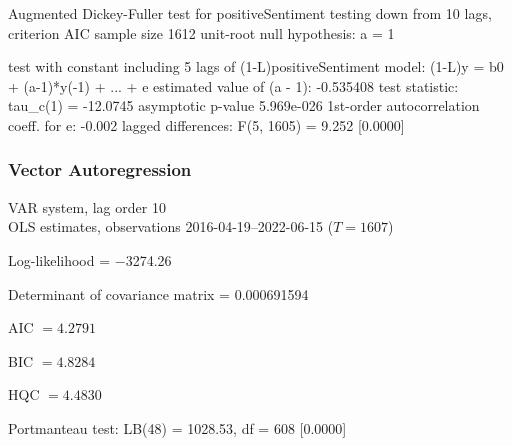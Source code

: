 Augmented Dickey-Fuller test for positiveSentiment
testing down from 10 lags, criterion AIC
sample size 1612
unit-root null hypothesis: a = 1

test with constant 
including 5 lags of (1-L)positiveSentiment
model: (1-L)y = b0 + (a-1)*y(-1) + ... + e
estimated value of (a - 1): -0.535408
test statistic: tau\_c(1) = -12.0745
asymptotic p-value 5.969e-026
1st-order autocorrelation coeff. for e: -0.002
lagged differences: F(5, 1605) = 9.252 [0.0000]

\subsubsection{Vector Autoregression}

\begin{center}
VAR system, lag order 10\\
OLS estimates, observations 2016-04-19--2022-06-15 ($T=1607$)
\end{center}
\noindent
Log-likelihood = $-$3274.26\par
\noindent
Determinant of covariance matrix = 0.000691594\par
\noindent
AIC $= 4.2791$ \par
\noindent
BIC $= 4.8284$ \par
\noindent
HQC $= 4.4830$ \par
\noindent
Portmanteau test: LB(48) = 1028.53, df = 608 [0.0000]\par
